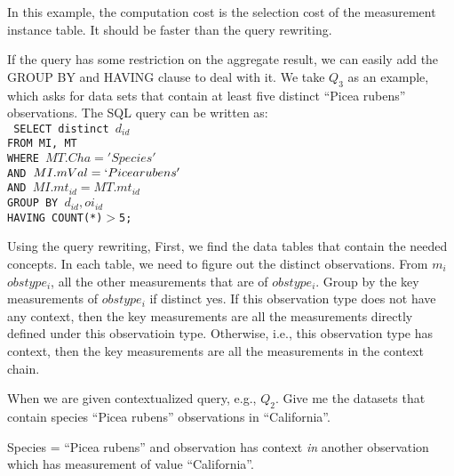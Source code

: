 \documentclass[conference]{IEEEtran}
\begin{document}
In this example, the computation cost is the selection cost of the
measurement instance table. 
It should be faster than the query rewriting. 

If the query has some restriction on the aggregate result, we can
easily add the GROUP BY and HAVING clause to deal with it. 
We take $Q_3$ as an example, which asks for data sets that contain at
least five distinct ``Picea rubens'' observations.
The SQL query can be written as: \\
{\tt 
SELECT distinct $d_{id}$\\
FROM MI, MT\\ 
WHERE $MT.Cha='Species'$ \\
AND $MI.mVal = `Picea rubens'$\\
AND $MI.mt_{id}=MT.mt_{id}$\\
GROUP BY $d_{id},oi_{id}$\\
HAVING COUNT(*)$>$5; %
}


Using the query rewriting, 
First, we find the data tables that contain the needed concepts. 
In each table, we need to figure out the distinct observations. 
From $m_i$ $obstype_i$, all the other measurements that are of
$obstype_i$. 
Group by the key measurements of $obstype_i$ if distinct yes.
If this observation type does not have any context, then the key
measurements are all the measurements directly defined under this
observatioin type. Otherwise, i.e., this observation type has context,
then the key measurements are all the measurements in the context
chain. 

When we are given contextualized query, e.g., $Q_2$. 
Give me the datasets that contain species ``Picea rubens'' observations in ``California''. 

Species = ``Picea rubens'' and observation has context {\em in}
another observation which has measurement of value ``California''. 



\end{document}
